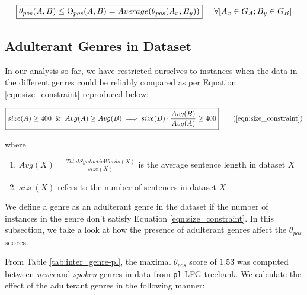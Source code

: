 \begin{equation}
    \boxed{\theta_{pos}(A, B) \leq \Theta_{pos}(A, B) = Average(\theta_{pos}(A_{x}, B_{y}))} \hspace{5mm} \forall [A_{x} \in G_{A}; B_{y} \in G_{B}]
\label{eqn:theta_pos_combo_limit}
\end{equation}

\subsection{Adulterant Genres in Dataset}
\label{sec:adulterant}

In our analysis so far, we have restricted ourselves to instances when the data in the different genres could be reliably compared as per Equation \ref{eqn:size_constraint} reproduced below:

\begin{equation}
\boxed{size(A) \geq 400 \And Avg(A) \geq Avg(B) \implies size(B) \cdot \frac{Avg(B)}{Avg(A)} \geq 400} \tag{\ref{eqn:size_constraint}}
\end{equation}

 where

\begin{enumerate}
    \item $Avg(X) = \frac{Total Syntactic Words(X)}{size(X)}$ is the average sentence length in dataset $X$
    \item $size(X)$ refers to the number of sentences in dataset $X$
\end{enumerate}


We define a genre as an adulterant genre in the dataset if the number of instances in the genre don't satisfy Equation \ref{eqn:size_constraint}. In this subsection, we take a look at how the presence of adulterant genres affect the $\theta_{pos}$ scores.

From Table \ref{tab:inter_genre-pl}, the maximal $\theta_{pos}$ score of $1.53$ was computed between \textit{news} and \textit{spoken} genres in data from \texttt{pl}-LFG treebank. We calculate the effect of the adulterant genres in the following manner:

